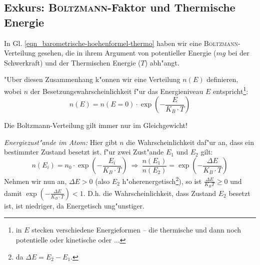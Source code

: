 \subsection{Exkurs: \textsc{Boltzmann}-Faktor und Thermische Energie}
\label{kap_exkurs:bolzmann-faktorn-und-thermische-energie}

In Gl. \eqref{eqn_barometrische-hoehenformel-thermo} haben wir eine
\textsc{Boltzmann}-Verteilung gesehen, die in ihrem Argument von
potentieller Energie ($mg$ bei der Schwerkraft) und der Thermischen
Energie ($T$) abh"angt. 

"Uber diesen Zusammenhang k"onnen wir eine Verteilung $n(E)$ definieren,
wobei $n$ der Besetzungswahrscheinlichkeit f"ur das Energieniveau $E$
entspricht\footnote{in $E$ stecken verschiedene Energieformen -- die
  thermische und dann noch potentielle oder kinetische oder ...}:
\begin{equation}
   \label{eqn_bolzmann-verteilung}
   n(E) = n(E = 0) \cdot \exp \left ( - \frac{E}{K_B \cdot T} \right )
\end{equation}
\begin{Wichtig}
   Die Boltzmann-Verteilung gilt immer nur im Gleichgewicht!
\end{Wichtig}





\begin{Beispiel}

   \emph{Energiezust"ande im Atom:} Hier gibt $n$ die
   Wahrscheinlichkeit daf"ur an, dass ein bestimmter Zustand besetzt
   ist. f"ur zwei Zust"ande $E_1$ und $E_2$ gilt:
\begin{equation*}
   n(E_i) = n_0 \cdot \exp \left ( - \frac{E_i}{K_B \cdot T} \right ) ~
      \Rightarrow ~ \frac{n(E_1)}{n(E_2)} = 
\exp \left ( - \frac{\Delta E}{K_B \cdot T} \right )
\end{equation*}
Nehmen wir nun an, $\Delta E > 0$ (also $E_2$
h"oherenergetisch\footnote{da $\Delta E = E_2 - E_1$.}), so ist
$\frac{\Delta E}{K_BT} \geq 0$ und damit $\exp \left ( - \frac{\Delta
     E}{K_B \cdot T} \right ) < 1$. D.h. die Wahrscheinlichkeit, dass
Zustand $E_2$ besetzt ist, ist niedriger, da Energetisch ung"unstiger.
\end{Beispiel}

















